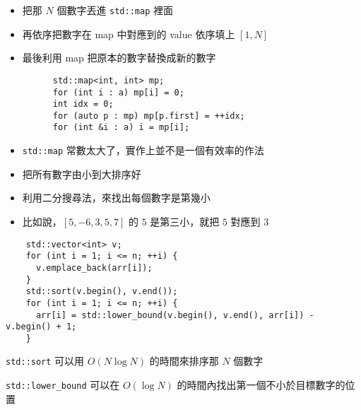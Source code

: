 \documentclass[standalone]{beamer}
\begin{document}
\begin{frame}[fragile]{}
  \begin{itemize}
    \item 把那 $N$ 個數字丟進 \texttt{std::map} 裡面
    \item 再依序把數字在 map 中對應到的 value 依序填上 $[1, N]$
    \item 最後利用 map 把原本的數字替換成新的數字
    \begin{verbatim}
      std::map<int, int> mp;
      for (int i : a) mp[i] = 0;
      int idx = 0;
      for (auto p : mp) mp[p.first] = ++idx;
      for (int &i : a) i = mp[i];
    \end{verbatim}
    \item \texttt{std::map} 常數太大了，實作上並不是一個有效率的作法
  \end{itemize}
\end{frame}

\begin{frame}[fragile]{}
  \begin{itemize}
    \item 把所有數字由小到大排序好
    \item 利用二分搜尋法，來找出每個數字是第幾小
    \item 比如說，$[5, -6, 3, 5, 7]$ 的 $5$ 是第三小，就把 $5$ 對應到 $3$
  \end{itemize}
\end{frame}

\begin{frame}[fragile]{}
  \begin{verbatim}
    std::vector<int> v;
    for (int i = 1; i <= n; ++i) {
      v.emplace_back(arr[i]);
    }
    std::sort(v.begin(), v.end());
    for (int i = 1; i <= n; ++i) {
      arr[i] = std::lower_bound(v.begin(), v.end(), arr[i]) - v.begin() + 1;
    }
  \end{verbatim}
  
  \texttt{std::sort} 可以用 $O(N \log N)$ 的時間來排序那 $N$ 個數字

  \texttt{std::lower\_bound} 可以在 $O(\log N)$ 的時間內找出第一個不小於目標數字的位置
\end{frame}
\end{document}
